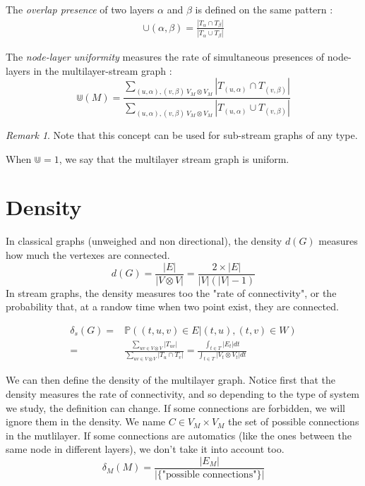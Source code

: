 \documentclass[dvipsnames,a4paper,11pt]{article}
\theoremstyle{definition}
\theoremstyle{remark}
\newtheorem{rmq}{Remark}
\theoremstyle{remark}
\begin{document}
	The {\em overlap presence} of two layers $\alpha$ and $\beta$ is defined on the same pattern :
	\begin{align*}
		\cup(\alpha,\beta) = \frac{|T_{\alpha}\cap T_{\beta}|}{|T_{\alpha}\cup T_{\beta}|}
	\end{align*}

    The {\em node-layer uniformity} measures the rate of simultaneous presences of node-layers in the multilayer-stream graph :
    \[
    	\Cup(M) = \frac{\sum_{(u,\alpha),(v,\beta) \ V_M \otimes V_M}{|T_{(u,\alpha)} \cap T_{(v,\beta)}|}}{\sum_{(u,\alpha),(v,\beta) \ V_M \otimes V_M}{|T_{(u,\alpha)}\cup T_{(v,\beta)}|}}
    \]

	\begin{rmq}
		Note that this concept can be used for sub-stream graphs of any type.
	\end{rmq}

	When $\Cup=1$, we say that the multilayer stream graph is uniform.



    \section{Density}
	In classical graphs (unweighed and non directional), the density $d(G)$ measures how much the vertexes are connected.
		\[
			d(G) = \frac{|E|}{|V\otimes V|} = \frac{2\times |E|}{|V|(|V|-1)}
		\]
	In stream graphs, the density measures too the "rate of connectivity", or the probability that, at a randow time when two point exist, they are connected.

		\begin{align*}
			\delta_s(G) = & \mathbb{P}((t,u,v)\in E| (t,u),(t,v) \in W) \\
			 =  & \frac{\sum_{uv \in V \otimes V}{|T_{uv}|}}{\sum_{uv \in V\otimes V}{|T_u\cap T_v|}}= \frac{\int_{t\in T}{|E_t|dt}}{\int_{t\in T}{|V_t\otimes V_t|dt}}
		\end{align*}

	We can then define the density of the multilayer graph. Notice first that the density measures the rate of connectivity, and so depending to the type of system we study, the definition can change. If some connections are forbidden, we will ignore them in the density. We name $C \in V_M\times V_M$ the set of possible connections in the mutlilayer. If some connections are automatics (like the ones between the same node in different layers), we don't take it into account too.
	\[
		\delta_M (M) = \frac{|E_M|}{|\{\text{"possible connections"}\}|}
	\]
\end{document}
